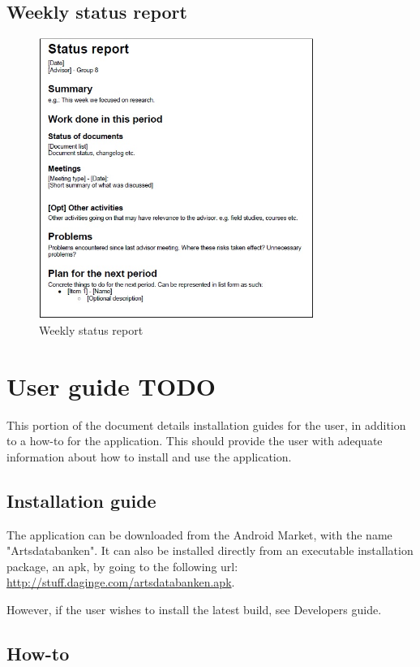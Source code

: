 	\newpage
	\subsection{Weekly status report}
		\begin{figure}[htb]
			\centering
			\includegraphics[width=0.8\textwidth]{appendix/weekly_status_report.jpg}
			\caption{Weekly status report}
			\label{fig:weekly-status-report}
		\end{figure}

\newpage
\section{User guide TODO}
This portion of the document details installation guides for the user, in addition to a how-to for the application. This should provide the user with adequate information about how to install and use the application.
\subsection{Installation guide}
The application can be downloaded from the Android Market, with the name "Artsdatabanken". It can also be installed directly from an executable installation package, an apk, by going to the following url: \url{http://stuff.daginge.com/artsdatabanken.apk}.

However, if the user wishes to install the latest build, see Developers guide.

\subsection{How-to}
